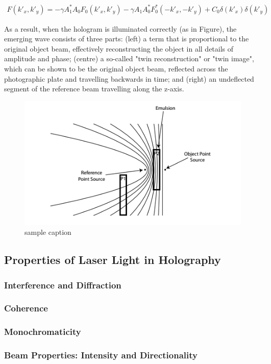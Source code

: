 \documentclass[12pt]{article}
\begin{document}
\vspace{-2ex}
\begin{gather*}
    F(k'_x,k'_y) = - \gamma A_1^* A_0 F_0 (k'_x,k'_y) - \gamma A_1 A_0^* F_0^* (-k'_x, -k'_y) + C_0 \delta (k'_x)\delta(k'_y)
\end{gather*}

As a result, when the hologram is illuminated correctly (as in Figure), the emerging wave consists of three parts: (left) a term that is proportional to the original object beam, effectively
reconstructing the object in all details of amplitude and phase; (centre) a so-called "twin reconstruction" or "twin image", which can be shown to be the original object beam, reflected across the
photographic plate and travelling backwards in time; and (right) an undeflected segment of the reference beam travelling along the z-axis.

\begin{figure}[H]
    \centering
    \includegraphics[width=.5\textwidth]{holography1.png}
    \caption{\centering sample caption \protect\cite{princetonholo}}
    \label{fig:1}
\end{figure}

\subsection{Properties of Laser Light in Holography}

\subsubsection{Interference and Diffraction}

\subsubsection{Coherence}


\subsubsection{Monochromaticity}


\subsubsection{Beam Properties: Intensity and Directionality}
\end{document}
